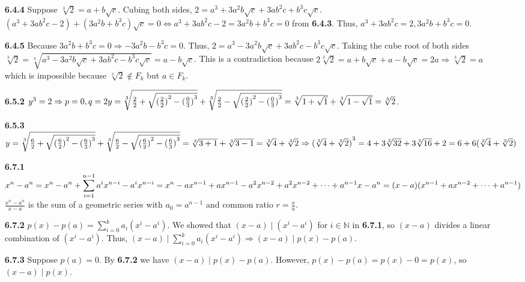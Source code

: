 \documentclass[10pt]{article}
\begin{document}
\begin{enumerate}
    \item [\textbf{6.4.4}] Suppose $\sqrt[3]{2}=a+b\sqrt{c}$. 
    Cubing both sides, $2=a^3+3a^2b\sqrt{c}+3ab^2c+b^3c\sqrt{c}$.
    $(a^3+3ab^2c-2)+(3a^2b+b^3c)\sqrt{c}=0\Leftrightarrow a^3+3ab^2c-2=3a^2b+b^3c=0$ from \textbf{6.4.3}.
    Thus, $a^3+3ab^2c=2,3a^2b+b^3c=0$.
    \item [\textbf{6.4.5}] Because $3a^2b+b^3c=0\Rightarrow -3a^2b-b^3c=0$. 
    Thus, $2=a^3-3a^2b\sqrt{c}+3ab^2c-b^3c\sqrt{c}$.
    Taking the cube root of both sides $\sqrt[3]{2}=\sqrt[3]{a^3-3a^2b\sqrt{c}+3ab^2c-b^3c\sqrt{c}}=a-b\sqrt{c}$.
    This is a contradiction because $2\sqrt[3]{2}=a+b\sqrt{c}+a-b\sqrt{c}=2a\Rightarrow \sqrt[3]{2}=a$ which is impossible because $\sqrt[3]{2}\notin F_k$ but $a\in F_k$.
    \item [\textbf{6.5.2}] $y^3=2\Rightarrow p=0,q=2\\
    y=\sqrt[3]{\frac{2}{2}+\sqrt{{(\frac{2}{2})}^2-{(\frac{0}{3})}^3}}+\sqrt[3]{\frac{2}{2}-\sqrt{{(\frac{2}{2})}^2-{(\frac{0}{3})}^3}}\\
    =\sqrt[3]{1+\sqrt{1}}+\sqrt[3]{1-\sqrt{1}}=\sqrt[3]{2}$.
    \item [\textbf{6.5.3}] $y=\sqrt[3]{\frac{6}{2}+\sqrt{{(\frac{6}{2})}^2-{(\frac{6}{3})}^3}}+\sqrt[3]{\frac{6}{2}-\sqrt{{(\frac{6}{2})}^2-{(\frac{6}{3})}^3}}\\
    =\sqrt[3]{3+1}+\sqrt[3]{3-1}=\sqrt[3]{4}+\sqrt[3]{2}\\
    \Rightarrow {(\sqrt[3]{4}+\sqrt[3]{2})}^3=4+3\sqrt[3]{32}+3\sqrt[3]{16}+2=6+6(\sqrt[3]{4}+\sqrt[3]{2})$
    \item [\textbf{6.7.1}] 
    $\displaystyle x^n-a^n=x^n-a^n+\sum_{i=1}^{n-1}a^i x^{n-i}-a^i x^{n-i}\\
    =x^n-ax^{n-1}+ax^{n-1}-a^2x^{n-2}+a^2x^{n-2}+\cdots+a^{n-1}x-a^n\\
    =(x-a)(x^{n-1}+ax^{n-2}+\cdots +a^{n-1})$\\
    $\frac{x^n-a^n}{x-a}$ is the sum of a geometric series with $a_0=a^{n-1}$ and common ratio $r=\frac{x}{a}$.
    \item [\textbf{6.7.2}] $\displaystyle p(x)-p(a)=\sum_{i=0}^{k}a_i(x^i-a^i)$. We showed that $(x-a)\mid (x^i-a^i)$ for $i\in\mathbb{N}$ in \textbf{6.7.1}, so $(x-a)$ divides a linear combination of $(x^i-a^i)$.
    Thus, $\displaystyle (x-a)\mid \sum_{i=0}^{k}a_i(x^i-a^i)\Rightarrow (x-a)\mid p(x)-p(a)$.
    \item [\textbf{6.7.3}] Suppose $p(a)=0$. By \textbf{6.7.2} we have $(x-a)\mid p(x)-p(a)$. However, $p(x)-p(a)=p(x)-0=p(x)$, so $(x-a)\mid p(x)$.
\end{enumerate}
\end{document}
